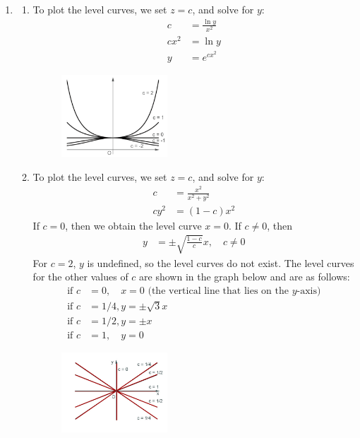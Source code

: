 \documentclass{article}
\begin{document}
\begin{enumerate}
\item
\begin{enumerate}
\item To plot the level curves, we set $z = c$, and solve for $y$: 
\begin{align*} 
  c &= \frac{\ln y}{x^2} \\
  cx^2&= \ln y \\
  y &= e^{cx^2}
\end{align*}
\begin{figure}[!htbp]
  \begin{center}
    \includegraphics[width=0.4\textwidth]{LevelCurvesA.pdf}
  \end{center}
\end{figure}
\item To plot the level curves, we set $z = c$, and solve for $y$: 
\begin{align*} 
  c &= \frac{x^2}{x^2+y^2} \\
  cy^2 &= (1-c)x^2
\end{align*}
If $c=0$, then we obtain the level curve $x = 0$. If $c \ne0$, then
\begin{align*} 
  y &= \pm \sqrt{\frac{1-c}{c}}x, \quad c \ne0
\end{align*}
For $c=2$, $y$ is undefined, so the level curves do not exist. The level curves for the other values of $c$ are shown in the graph below and are as follows:
\begin{align*} 
  \text{if } c&=0, \quad x = 0 \text{ (the vertical line that lies on the } y \text{-axis})\\
  \text{if } c&=1/4, y = \pm \sqrt{3}x\\
  \text{if } c&=1/2, y = \pm x\\  
  \text{if } c&=1, \quad y = 0    
\end{align*}

\begin{figure}[!htbp]
  \begin{center}
    \includegraphics[width=0.4\textwidth]{LevelCurvesB.jpg}
  \end{center}
\end{figure}


\end{enumerate}
\end{enumerate}
\end{document}
